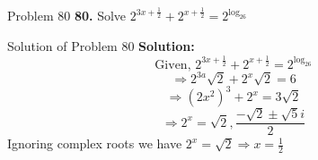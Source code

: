 \documentclass[aspectratio=1610,8pt]{beamer}
\begin{document}
\begin{frame}{Problem 80}
  \textbf{80.} Solve $2^{3x + \frac{1}{2}} + 2^{x + \frac{1}{2}} = 2^{\log_26}$
\end{frame}
\begin{frame}{Solution of Problem 80}
  \textbf{Solution:} $$\text{Given,~}2^{3x + \frac{1}{2}} + 2^{x + \frac{1}{2}} = 2^{\log_26}$$
  $$\Rightarrow 2^{3a}\sqrt{2} + 2^x\sqrt{2} = 6$$
  $$\Rightarrow (2x^2)^3 + 2^x = 3\sqrt{2}$$
  $$\Rightarrow 2^x = \sqrt{2}, \frac{-\sqrt{2}\pm\sqrt{5}i}{2}$$
  Ignoring complex roots we have $2^x = \sqrt{2} \Rightarrow x = \frac{1}{2}$
\end{frame}
\end{document}
